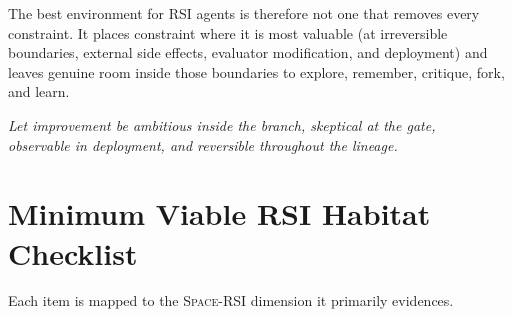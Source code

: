 \documentclass[11pt,a4paper]{article}
\newcommand{\SpaceRSI}{\textsc{Space-RSI}}
\begin{document}
The best environment for RSI agents is therefore not one that removes every constraint. It places constraint where it is most valuable (at irreversible boundaries, external side effects, evaluator modification, and deployment) and leaves genuine room inside those boundaries to explore, remember, critique, fork, and learn.

\begin{center}
\emph{Let improvement be ambitious inside the branch, skeptical at the gate,\\ observable in deployment, and reversible throughout the lineage.}
\end{center}

\appendix

\section{Minimum Viable RSI Habitat Checklist}

Each item is mapped to the \SpaceRSI{} dimension it primarily evidences.
\end{document}
